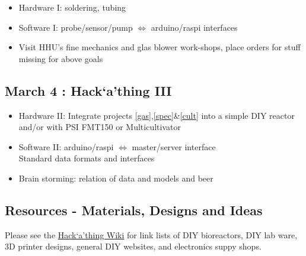 \documentclass[12pt,a4paper]{scrartcl}
\newcommand{\hack}[0]{Hack`a'thing}
\begin{document}

\begin{itemize}
\item Hardware I: soldering, tubing
\item Software I: probe/sensor/pump $\Leftrightarrow$ arduino/raspi interfaces
\item Visit HHU's fine mechanics and glas blower work-shops, place
  orders for stuff missing for above goals
\end{itemize}

\subsection{March 4 : \hack{} III}

\begin{itemize}
\item Hardware II: Integrate projects \ref{gas},\ref{spec}\&\ref{cult}
  into a simple DIY reactor and/or with PSI FMT150 or Multicultivator
\item Software II: arduino/raspi $\Leftrightarrow$  master/server interface\\
  Standard data formats and interfaces
\item Brain storming: relation of data and models and beer
\end{itemize}

\subsection*{Resources - Materials, Designs and Ideas}

Please see the
\href{https://wiki.hhu.de/display/QTBP/1st+QTB+PBR+Hack\%60a'thing}{Hack`a'thing
  Wiki} for link lists of DIY bioreactors, DIY lab ware, 3D printer
designs, general DIY websites, and electronics suppy shops.
\end{document}
